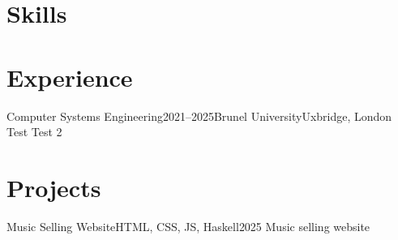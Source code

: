 \documentclass{cv}
\begin{document}
\makeheader

\section{Skills}
\begin{cvSkills}
\end{cvSkills}

\section{Experience}
\begin{cvExperience}{Computer Systems Engineering}{2021--2025}{Brunel University}{Uxbridge, London}
    \cvInfo Test
    \cvInfo Test 2
\end{cvExperience}


\section{Projects}
\begin{cvProject}{Music Selling Website}{HTML, CSS, JS, Haskell}{2025}
    \cvInfo Music selling website
\end{cvProject}
\end{document}
